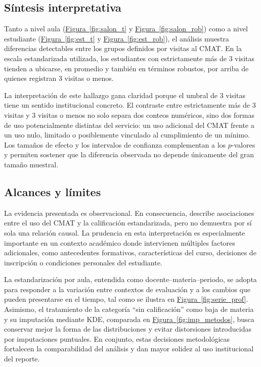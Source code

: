 \documentclass[8pt,a4paper]{article} %
\numberwithin{figure}{subsection}
\begin{document}
\subsection{Síntesis interpretativa}
Tanto a nivel aula (\hyperref[fig:salon_t]{Figura~\ref{fig:salon_t}} y \hyperref[fig:salon_rob]{Figura~\ref{fig:salon_rob}}) como a nivel estudiante (\hyperref[fig:est_t]{Figura~\ref{fig:est_t}} y \hyperref[fig:est_rob]{Figura~\ref{fig:est_rob}}), el análisis muestra diferencias detectables entre los grupos definidos por visitas al CMAT. En la escala estandarizada utilizada, los estudiantes con estrictamente más de 3 visitas tienden a ubicarse, en promedio y también en términos robustos, por arriba de quienes registran 3 visitas o menos.

La interpretación de este hallazgo gana claridad porque el umbral de 3 visitas tiene un sentido institucional concreto. El contraste entre estrictamente más de 3 visitas y 3 visitas o menos no solo separa dos conteos numéricos, sino dos formas de uso potencialmente distintas del servicio: un uso adicional del CMAT frente a un uso nulo, limitado o posiblemente vinculado al cumplimiento de un mínimo. Los tamaños de efecto y los intervalos de confianza complementan a los $p$-valores y permiten sostener que la diferencia observada no depende únicamente del gran tamaño muestral.

\subsection{Alcances y límites}
La evidencia presentada es observacional. En consecuencia, describe asociaciones entre el uso del CMAT y la calificación estandarizada, pero no demuestra por sí sola una relación causal. La prudencia en esta interpretación es especialmente importante en un contexto académico donde intervienen múltiples factores adicionales, como antecedentes formativos, características del curso, decisiones de inscripción o condiciones personales del estudiante.

La estandarización por aula, entendida como docente--materia--periodo, se adopta para responder a la variación entre contextos de evaluación y a los cambios que pueden presentarse en el tiempo, tal como se ilustra en \hyperref[fig:serie_prof]{Figura~\ref{fig:serie_prof}}. Asimismo, el tratamiento de la categoría ``sin calificación'' como baja de materia y su imputación mediante KDE, comparada en \hyperref[fig:imp_metodos]{Figura~\ref{fig:imp_metodos}}, busca conservar mejor la forma de las distribuciones y evitar distorsiones introducidas por imputaciones puntuales. En conjunto, estas decisiones metodológicas fortalecen la comparabilidad del análisis y dan mayor solidez al uso institucional del reporte.
\end{document}
